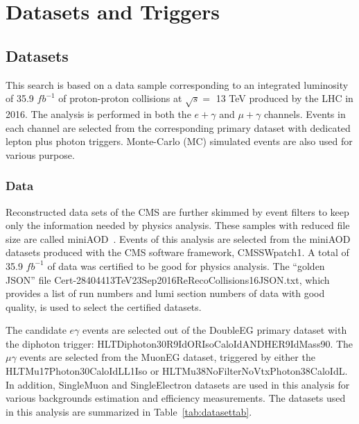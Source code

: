 \documentclass[thesis.tex]{subfiles}
\renewcommand\_{\textunderscore\allowbreak}
\begin{document}
\chapter{Datasets and Triggers}
\label{ch4}

\section{Datasets}
\label{sec:dataandsimulation}
This search is based on a data sample corresponding to an integrated luminosity of 35.9 $fb^{-1}$ of proton-proton collisions at $\sqrt{s} =$ 13 TeV produced by the LHC in 2016.
The analysis is performed in both the $e + \gamma$ and $\mu + \gamma$ channels. 
Events in each channel  are selected from the corresponding primary dataset with dedicated lepton plus photon triggers.
Monte-Carlo (MC) simulated events are also used for various purpose.  

\subsection{Data}
Reconstructed data sets of the CMS are further skimmed by event filters to keep only the information needed by physics analysis. 
These samples with reduced file size are called miniAOD~\cite{miniAOD}. 
Events of this analysis are selected from the miniAOD datasets produced with the CMS software framework, CMSSW\_8\_0\_26\_patch1.
A total of 35.9 $fb^{-1}$ of data was certified to be good for physics analysis. The ``golden JSON'' file 
Cert\_271036-284044\_13TeV\_23Sep2016ReReco\_Collisions16\_JSON.txt, which provides a list of run numbers and lumi section numbers of data with good quality, is used to select the certified datasets. 

The candidate $e\gamma$ events are selected out of the DoubleEG primary dataset with the diphoton trigger: HLT\_Diphoton30\_18\_R9Id\_OR\_IsoCaloId\_AND\_HE\_R9Id\_Mass90. 
The $\mu\gamma$ events are selected from the MuonEG dataset, triggered by either the HLT\_Mu17\_Photon30\_CaloIdL\_L1Iso or HLT\_Mu38NoFilterNoVtx\_Photon38\_CaloIdL. 
In addition, SingleMuon and SingleElectron datasets are used in this analysis for various backgrounds estimation and efficiency measurements. 
The datasets used in this analysis are summarized in Table~\ref{tab:datasettab}. \\
\end{document}
